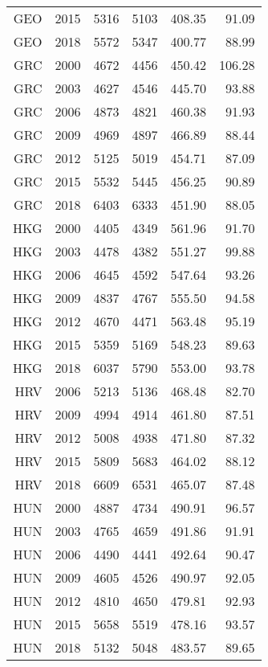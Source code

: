\begin{longtable}{|r|r|r|r|r|r|}
    GEO   & 2015  & 5316  & 5103  & 408.35 & 91.09 \\
    GEO   & 2018  & 5572  & 5347  & 400.77 & 88.99 \\
    GRC   & 2000  & 4672  & 4456  & 450.42 & 106.28 \\
    GRC   & 2003  & 4627  & 4546  & 445.70 & 93.88 \\
    GRC   & 2006  & 4873  & 4821  & 460.38 & 91.93 \\
    GRC   & 2009  & 4969  & 4897  & 466.89 & 88.44 \\
    GRC   & 2012  & 5125  & 5019  & 454.71 & 87.09 \\
    GRC   & 2015  & 5532  & 5445  & 456.25 & 90.89 \\
    GRC   & 2018  & 6403  & 6333  & 451.90 & 88.05 \\
    HKG   & 2000  & 4405  & 4349  & 561.96 & 91.70 \\
    HKG   & 2003  & 4478  & 4382  & 551.27 & 99.88 \\
    HKG   & 2006  & 4645  & 4592  & 547.64 & 93.26 \\
    HKG   & 2009  & 4837  & 4767  & 555.50 & 94.58 \\
    HKG   & 2012  & 4670  & 4471  & 563.48 & 95.19 \\
    HKG   & 2015  & 5359  & 5169  & 548.23 & 89.63 \\
    HKG   & 2018  & 6037  & 5790  & 553.00 & 93.78 \\
    HRV   & 2006  & 5213  & 5136  & 468.48 & 82.70 \\
    HRV   & 2009  & 4994  & 4914  & 461.80 & 87.51 \\
    HRV   & 2012  & 5008  & 4938  & 471.80 & 87.32 \\
    HRV   & 2015  & 5809  & 5683  & 464.02 & 88.12 \\
    HRV   & 2018  & 6609  & 6531  & 465.07 & 87.48 \\
    HUN   & 2000  & 4887  & 4734  & 490.91 & 96.57 \\
    HUN   & 2003  & 4765  & 4659  & 491.86 & 91.91 \\
    HUN   & 2006  & 4490  & 4441  & 492.64 & 90.47 \\
    HUN   & 2009  & 4605  & 4526  & 490.97 & 92.05 \\
    HUN   & 2012  & 4810  & 4650  & 479.81 & 92.93 \\
    HUN   & 2015  & 5658  & 5519  & 478.16 & 93.57 \\
    HUN   & 2018  & 5132  & 5048  & 483.57 & 89.65 \\

\end{longtable}
